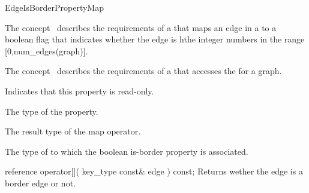 
\begin{ccRefConcept}{EdgeIsBorderPropertyMap}


\ccDefinition

The concept \ccRefName\ describes the requirements of a 
that maps an edge in a
to a boolean flag that indicates whether the edge is hthe integer numbers in the range [0,num_edges(graph)].

The concept \ccRefName\ describes the requirements of a  that accesses the  for a graph.

\ccRefines
  
\ccTypes
    {Indicates that this property is read-only.}
  
    {The type of the property.}
    
    {The result type of the map operator.}

  {The type of  to which the boolean is-border property is associated.}

\ccCreation
{}  %

\ccOperations

\ccMethod
  {reference operator[]( key_type const& edge ) const;}
  {Returns wether the edge is a border edge or not.}  


\ccHasModels
{}\\

\ccSeeAlso
{} 

\end{ccRefConcept}



